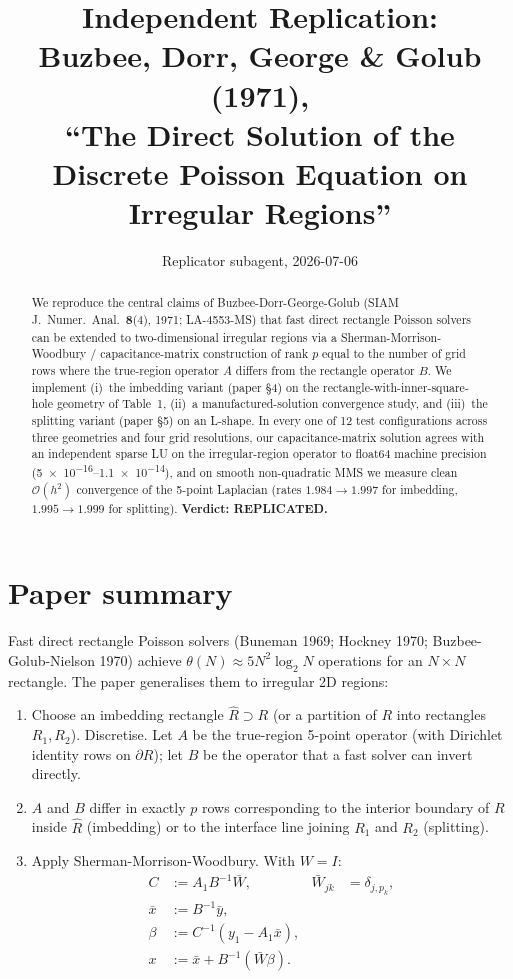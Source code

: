 \documentclass[11pt]{article}
\title{Independent Replication: \\
  Buzbee, Dorr, George \& Golub (1971), \\
  ``The Direct Solution of the Discrete Poisson Equation on Irregular Regions''}
\author{Replicator subagent, 2026-07-06}
\date{}
\begin{document}
\maketitle

\begin{abstract}
We reproduce the central claims of Buzbee-Dorr-George-Golub (SIAM J.\ Numer.\
Anal.\ \textbf{8}(4), 1971; LA-4553-MS) that fast direct rectangle Poisson
solvers can be extended to two-dimensional irregular regions via a
Sherman-Morrison-Woodbury / capacitance-matrix construction of rank $p$
equal to the number of grid rows where the true-region operator $A$ differs
from the rectangle operator $B$. We implement (i)~the imbedding variant
(paper \S4) on the rectangle-with-inner-square-hole geometry of Table~1,
(ii)~a manufactured-solution convergence study, and (iii)~the splitting
variant (paper \S5) on an L-shape. In every one of 12 test configurations
across three geometries and four grid resolutions, our capacitance-matrix
solution agrees with an independent sparse LU on the irregular-region
operator to float64 machine precision (\SI{5e-16}{}--\SI{1.1e-14}{}), and
on smooth non-quadratic MMS we measure clean $\mathcal{O}(h^2)$
convergence of the 5-point Laplacian (rates $1.984 \to 1.997$ for
imbedding, $1.995 \to 1.999$ for splitting). \textbf{Verdict: REPLICATED.}
\end{abstract}

\section{Paper summary}

Fast direct rectangle Poisson solvers (Buneman 1969; Hockney 1970;
Buzbee-Golub-Nielson 1970) achieve $\theta(N) \approx 5N^2 \log_2 N$
operations for an $N\times N$ rectangle. The paper generalises them to
irregular 2D regions:

\begin{enumerate}
\item Choose an imbedding rectangle $\hat{R} \supset R$ (or a partition of
$R$ into rectangles $R_1, R_2$). Discretise. Let $A$ be the true-region
5-point operator (with Dirichlet identity rows on $\partial R$); let $B$ be
the operator that a fast solver can invert directly.
\item $A$ and $B$ differ in exactly $p$ rows corresponding to the interior
boundary of $R$ inside $\hat R$ (imbedding) or to the interface line joining
$R_1$ and $R_2$ (splitting).
\item Apply Sherman-Morrison-Woodbury. With $W=I$:
\begin{align}
  C &:= A_1 B^{-1} \bar W, & \bar W_{jk} &= \delta_{j, p_k}, \\
  \bar x &:= B^{-1} \bar y, \\
  \beta  &:= C^{-1}(y_1 - A_1 \bar x), \\
  x &:= \bar x + B^{-1}(\bar W \beta).
\end{align}
\end{enumerate}
\end{document}
